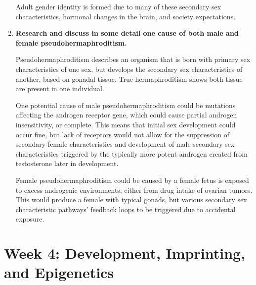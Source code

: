 \documentclass[basic]{inVerba-notes}
\begin{document}
\begin{enumerate}
    Adult gender identity is formed due to many of these secondary sex characteristics, hormonal changes in the brain, and society expectations. 

    \item \textbf{Research and discuss in some detail one cause of both male and female pseudohermaphroditism.}
    
    Pseudohermaphroditism describes an organism that is born with primary sex characteristics of one sex, but develops the secondary sex characteristics of another, based on gonadal tissue. True hermaphroditism shows both tissue are present in one individual.

    One potential cause of male pseudohermaphroditism could be mutations affecting the androgen receptor gene, which could cause partial androgen insensitivity, or complete. This means that initial sex development could occur fine, but lack of receptors would not allow for the suppression of secondary female characteristics and development of male secondary sex characteristics triggered by the typically more potent androgen created from testosterone later in development. 

    Female pseudohermaphroditism could be caused by a female fetus is exposed to excess androgenic environments, either from drug intake of ovarian tumors. This would produce a female with typical gonads, but various secondary sex characteristic pathways' feedback loops to be triggered due to accidental exposure.
  \end{enumerate}

  \section{Week 4: Development, Imprinting, and Epigenetics}
\end{document}
